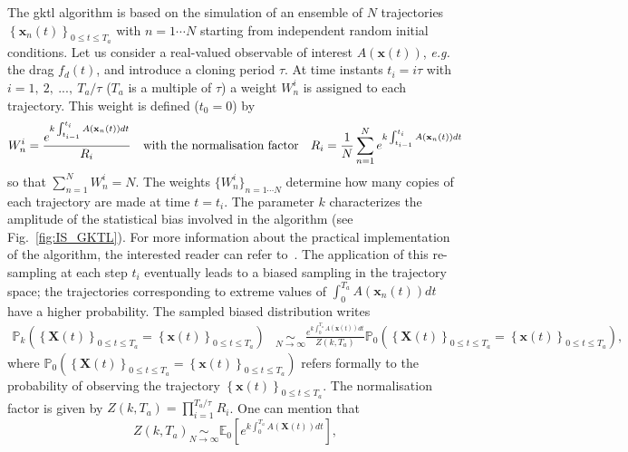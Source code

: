 \documentclass{jfm}
\begin{document}
The \ac{gktl} algorithm is based on the simulation of an ensemble of $N$ trajectories $\left\{\mathbf{x}_{n}(t)\right\}_{0\leq t \leq T_a}$ with $ n =1 \cdots N$ starting from independent random initial conditions.
%
Let us consider a real-valued observable of interest $A(\mathbf{x}(t))$, {\emph{e.g.} the drag $f_d(t)$}, and introduce a cloning period $\tau$.
%
At time instants $t_{i}=i\tau$ with $i=1,~2,~...,~T_{a}/\tau$ ($T_{a}$ is a multiple of $\tau$) a weight $W_{n}^{i}$ is assigned to each trajectory. This weight is defined ($t_0=0$) by
%
\begin{equation}
W_{n}^{i}=\frac{e^{k\intop_{t_{i-1}}^{t_{i}}A(\mathbf{x}_{n}(t))dt}}{R_{i}}\quad \mbox{with the normalisation factor} \quad R_{i}=\frac{1}{N}\sum_{n=1}^{N}e^{k\int_{t_{i-1}}^{t_{i}}A(\mathbf{x}_{n}(t))dt}
\label{eq:Weight}
\end{equation}
so that $\sum_{n=1}^N W_n^i = N$.
%
%
{The weights $\{W_{n}^{i}\}_{n=1\cdots N}$ determine how many copies of each trajectory are made at time $t=t_i$. The parameter $k$ characterizes the amplitude of the statistical bias involved in the algorithm (see Fig.~\ref{fig:IS_GKTL}). For more information about the practical implementation of the algorithm, the interested reader can refer to~\cite{brewer2018efficient, lestang:tel-01974316}}.
The application of this re-sampling at each step $t_i$ eventually leads to a biased sampling in the trajectory space; the trajectories corresponding to extreme values of $\int_{0}^{T_a}A(\mathbf{x}_{n}(t))dt$ have a higher probability.
%
The sampled biased distribution writes
%
\begin{align}
\mathbb{P}_{k}\left(\left\{ \mathbf{X}(t)\right\} _{0\leq t\leq T_{a}}=\left\{ \mathbf{x}(t)\right\} _{0\leq t\leq T_{a}}\right) &\underset{N\rightarrow\infty}{\sim} \frac{e^{k\int_{0}^{T_{a}}A(\mathbf{x}(t))dt}}{Z(k,T_a)}\mathbb{\mathbb{P}}_{0}\left(\left\{ \mathbf{X}(t)\right\} _{0\leq t\leq T_{a}}=\left\{ \mathbf{x}(t)\right\} _{0\leq t\leq T_{a}}\right),
\label{eq:Biased_Path_Approximation}
\end{align}
where
$\mathbb{P}_{0}\left(\left\{ \mathbf{X}(t)\right\} _{0\leq t\leq T_{a}} = \left\{ \mathbf{x}(t)\right\} _{0\leq t\leq T_{a}}\right)$ 
refers formally to the probability of observing the trajectory 
$\left\{ \mathbf{x}(t)\right\} _{0\leq t\leq T_{a}}$.
The normalisation factor is given by $Z(k,T_a)=\prod_{i=1}^{T_a/\tau}R_i$.
%
One can mention that
\begin{equation}
\label{eq:mean_field}
Z(k,T_a) \underset{N\to \infty}{\sim} \mathbb{E}_0\left[e^{k\int_{0}^{T_{a}}A(\mathbf{X}(t))dt}\right],
\end{equation}
\end{document}
